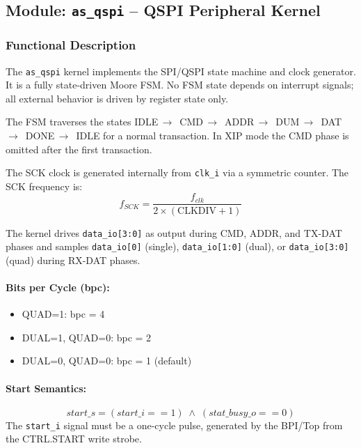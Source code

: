 \subsection{Module: \texttt{as\_qspi} -- QSPI Peripheral Kernel}
\label{subsec:asqspi_kernel}

\subsubsection{Functional Description}

The \texttt{as\_qspi} kernel implements the SPI/QSPI state machine and clock
generator. It is a fully state-driven Moore FSM. No FSM state depends on
interrupt signals; all external behavior is driven by register state only.

The FSM traverses the states IDLE\,$\to$\, CMD\,$\to$\, ADDR\,$\to$\, DUM\,$\to$\, DAT\,%
$\to$\, DONE\,$\to$\, IDLE for a normal transaction. In XIP mode the CMD phase
is omitted after the first transaction.

The SCK clock is generated internally from \texttt{clk\_i} via a symmetric
counter. The SCK frequency is:
\[
  f_{SCK} = \frac{f_{clk}}{2 \times (\text{CLKDIV} + 1)}
\]

The kernel drives \texttt{data\_io[3:0]} as output during CMD, ADDR, and TX-DAT
phases and samples \texttt{data\_io[0]} (single), \texttt{data\_io[1:0]} (dual),
or \texttt{data\_io[3:0]} (quad) during RX-DAT phases.

\paragraph{Bits per Cycle (bpc):}
\begin{itemize}
  \item QUAD=1: bpc = 4
  \item DUAL=1, QUAD=0: bpc = 2
  \item DUAL=0, QUAD=0: bpc = 1 (default)
\end{itemize}

\paragraph{Start Semantics:}
\[
  start\_s = (start\_i == 1) \;\land\; (stat\_busy\_o == 0)
\]
The \texttt{start\_i} signal must be a one-cycle pulse, generated by the BPI/Top
from the CTRL.START write strobe.

